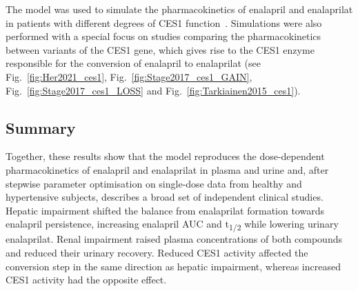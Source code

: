 \documentclass[pharmaceutics,article,submit,pdftex,moreauthors]{Definitions/mdpi}
\begin{document}
The model was used to simulate the pharmacokinetics of enalapril and enalaprilat in patients with different degrees of CES1 function~\cite{Her2021, Stage2017, Tarkiainen2015}. Simulations were also performed with a special focus on studies comparing the pharmacokinetics between variants of the CES1 gene, which gives rise to the CES1 enzyme responsible for the conversion of enalapril to enalaprilat (see Fig.~\ref{fig:Her2021_ces1}, Fig.~\ref{fig:Stage2017_ces1_GAIN}, Fig.~\ref{fig:Stage2017_ces1_LOSS} and Fig.~\ref{fig:Tarkiainen2015_ces1}).

\subsection{Summary}
Together, these results show that the model reproduces the dose-dependent pharmacokinetics of enalapril and enalaprilat in plasma and urine and, after stepwise parameter optimisation on single-dose data from healthy and hypertensive subjects, describes a broad set of independent clinical studies. Hepatic impairment shifted the balance from enalaprilat formation towards enalapril persistence, increasing enalapril AUC and t\textsubscript{1/2} while lowering urinary enalaprilat. Renal impairment raised plasma concentrations of both compounds and reduced their urinary recovery. Reduced CES1 activity affected the conversion step in the same direction as hepatic impairment, whereas increased CES1 activity had the opposite effect.
\end{document}
